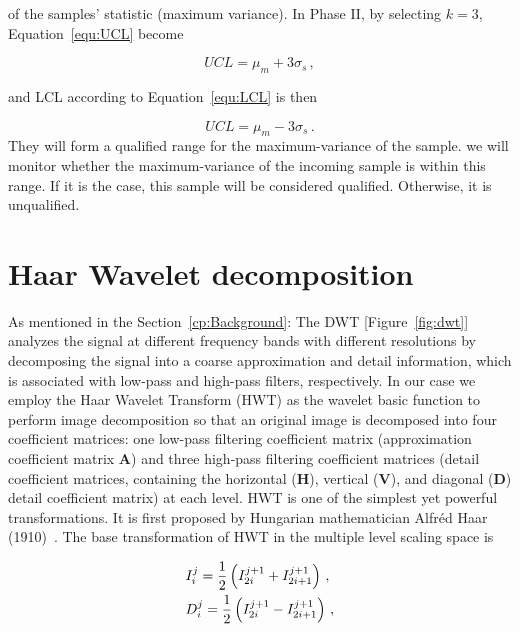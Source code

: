 of the samples' statistic (maximum variance). In Phase II, by selecting $k = 3$, Equation~\ref{equ:UCL} become 

\begin{equation}
    U C L=\mu_{m}+3 \sigma_{s}\,,
    \label{equ:UCL_real}
\end{equation}

and LCL according to Equation~\ref{equ:LCL} is then

\begin{equation}
    U C L=\mu_{m}-3 \sigma_{s}\,.
    \label{equ:LCL_real}
\end{equation}
They will form a qualified range for the maximum-variance of the sample.
we will monitor whether the maximum-variance of the incoming sample is within this range. If it is the case, this sample will be considered qualified. Otherwise, it is unqualified.

\section{Haar Wavelet decomposition}
\label{sec:dwt}
As mentioned in the Section~\ref{cp:Background}: The DWT [Figure~\ref{fig:dwt}] analyzes the signal at different frequency bands with different resolutions by decomposing the signal into a coarse approximation and detail information, which is associated with low-pass and high-pass filters, respectively. In our case we employ the Haar Wavelet Transform (HWT) as the wavelet basic function to perform image decomposition so that an original image is decomposed into four coefficient matrices: one low-pass filtering coefficient matrix (approximation coefficient matrix $\mathbf{A}$) and three high-pass filtering coefficient matrices (detail coefficient matrices, containing the horizontal ($\mathbf{H}$), vertical ($\mathbf{V}$), and diagonal ($\mathbf{D}$) detail coefficient matrix) at each level. HWT is one of the simplest yet powerful transformations. It is first proposed by Hungarian mathematician Alfréd Haar (1910)~\nocite{haar1910theorie}. The base transformation of HWT in the multiple level scaling space is

\begin{equation}
\begin{aligned}
\centering&I_{i}^{j}=\frac{1}{2}\left(I_{2 i}^{j+1}+I_{2 i+1}^{j+1}\right)\,, \\
\centering&D_{i}^{j}=\frac{1}{2}\left(I_{2 i}^{j+1}-I_{2 i+1}^{j+1}\right)\,,
\end{aligned}
\end{equation}


